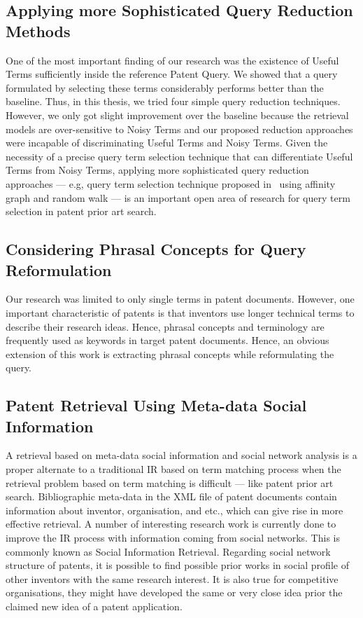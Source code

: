 \subsection{Applying more Sophisticated Query Reduction Methods}
\label{subsec:SophisticatedQueryReduction}
One of the most important finding of our research was the existence of Useful Terms sufficiently inside the reference Patent Query. 
We showed that a query formulated by selecting these terms considerably performs better than the baseline. 
Thus, in this thesis, we tried four simple query reduction techniques. However, we only got slight improvement over the baseline because the retrieval models are over-sensitive to Noisy Terms and our proposed reduction approaches were incapable of discriminating Useful Terms and Noisy Terms. 
Given the necessity of a precise query term selection technique that can differentiate Useful Terms from Noisy Terms, 
applying more sophisticated query reduction approaches --- e.g, query term selection technique proposed in~\citep{maxwell2013compact} using affinity graph and random walk --- is an important open area of research for query term selection in patent prior art search.     

\subsection{Considering Phrasal Concepts for Query Reformulation }
\label{subsec: PhraseAnalysis}
Our research was limited to only single terms in patent documents. 
However, one important characteristic of patents is that 
inventors use longer technical terms to describe their research ideas. 
Hence, phrasal concepts and terminology 
are frequently used as keywords in target patent documents.
Hence, an obvious extension of this work is extracting phrasal concepts while reformulating the query. 

\subsection{Patent Retrieval Using Meta-data Social Information}
\label{subsec: Meta-dataNetworkAnalysis}
A retrieval based on meta-data social information and social network analysis 
is a proper alternate to a traditional IR based on term matching process 
when the retrieval problem based on term matching is difficult --- like patent prior art search.  
Bibliographic meta-data in the XML file of patent documents contain information about
inventor, organisation, and etc., which can give rise in more effective retrieval. 
A number of interesting research work is currently done to improve the IR process with
information coming from social networks. This is commonly known as Social Information Retrieval. 
Regarding social network structure of patents, it is possible to 
find possible prior works in social profile of other inventors with the same research interest.
It is also true for competitive
organisations, they might have developed the same or very close idea prior the claimed new
idea of a patent application.


